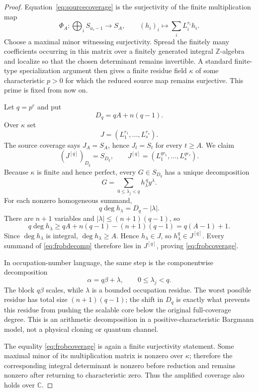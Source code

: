 \documentclass[10pt,a4paper]{amsart}
\newcommand{\CC}{\mathbb C}
\begin{document}
\begin{proof}
Equation~\eqref{eq:sourcecoverage} is the surjectivity of the finite multiplication map
\[
  \Phi_A:\bigoplus_i S_{u_i-1}\longrightarrow S_A,
  \qquad
  (h_i)_i\longmapsto\sum_iL_i^{r_i}h_i.
\]
Choose a maximal minor witnessing surjectivity.  Spread the finitely many coefficients occurring in this matrix over a finitely generated integral $\mathbb Z$-algebra and localize so that the chosen determinant remains invertible.  A standard finite-type specialization argument then gives a finite residue field $\kappa$ of some characteristic $p>0$ for which the reduced source map remains surjective.  This prime is fixed from now on.

Let $q=p^e$ and put
\[
  D_q=qA+n(q-1).
\]
Over $\kappa$ set
\[
  J=(L_1^{r_1},\ldots,L_s^{r_s}).
\]
The source coverage says $J_A=S_A$, hence $J_t=S_t$ for every $t\ge A$.  We claim
\begin{equation}
  (J^{[q]})_{D_q}=S_{D_q},
  \qquad
  J^{[q]}=(L_1^{qr_1},\ldots,L_s^{qr_s}).
  \label{eq:frobcoverage}
\end{equation}
Because $\kappa$ is finite and hence perfect, every $G\in S_{D_q}$ has a unique decomposition
\begin{equation}
  G=\sum_{0\le\lambda_j<q} h_\lambda^{\,q}y^\lambda.
  \label{eq:frobdecomp}
\end{equation}
For each nonzero homogeneous summand,
\[
  q\deg h_\lambda=D_q-|\lambda|.
\]
There are $n+1$ variables and $|\lambda|\le(n+1)(q-1)$, so
\[
  q\deg h_\lambda
  \ge qA+n(q-1)-(n+1)(q-1)
  =q(A-1)+1.
\]
Since $\deg h_\lambda$ is integral, $\deg h_\lambda\ge A$.  Hence $h_\lambda\in J$, so $h_\lambda^q\in J^{[q]}$.  Every summand of \eqref{eq:frobdecomp} therefore lies in $J^{[q]}$, proving \eqref{eq:frobcoverage}.

In occupation-number language, the same step is the componentwise decomposition
\[
  \alpha=q\beta+\lambda,
  \qquad 0\le\lambda_j<q.
\]
The block $q\beta$ scales, while $\lambda$ is a bounded occupation residue.  The worst possible residue has total size $(n+1)(q-1)$; the shift in $D_q$ is exactly what prevents this residue from pushing the scalable core below the original full-coverage degree.  This is an arithmetic decomposition in a positive-characteristic Bargmann model, not a physical cloning or quantum channel.

The equality \eqref{eq:frobcoverage} is again a finite surjectivity statement.  Some maximal minor of its multiplication matrix is nonzero over $\kappa$; therefore the corresponding integral determinant is nonzero before reduction and remains nonzero after returning to characteristic zero.  Thus the amplified coverage also holds over $\CC$.


\end{proof}
\end{document}
